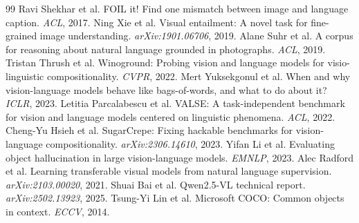\documentclass[10pt,twocolumn,letterpaper]{article}
\begin{document}
\vfill\break
\scriptsize
\begin{thebibliography}{99}
\setlength{\itemsep}{-1pt}
\setlength{\parskip}{0pt}
\setlength{\parsep}{0pt}
 Ravi Shekhar et al. FOIL it! Find one mismatch between image and language caption. {\em ACL}, 2017.
 Ning Xie et al. Visual entailment: A novel task for fine-grained image understanding. {\em arXiv:1901.06706}, 2019.
 Alane Suhr et al. A corpus for reasoning about natural language grounded in photographs. {\em ACL}, 2019.
 Tristan Thrush et al. Winoground: Probing vision and language models for visio-linguistic compositionality. {\em CVPR}, 2022.
 Mert Yuksekgonul et al. When and why vision-language models behave like bags-of-words, and what to do about it? {\em ICLR}, 2023.
 Letitia Parcalabescu et al. VALSE: A task-independent benchmark for vision and language models centered on linguistic phenomena. {\em ACL}, 2022.
 Cheng-Yu Hsieh et al. SugarCrepe: Fixing hackable benchmarks for vision-language compositionality. {\em arXiv:2306.14610}, 2023.
 Yifan Li et al. Evaluating object hallucination in large vision-language models. {\em EMNLP}, 2023.
 Alec Radford et al. Learning transferable visual models from natural language supervision. {\em arXiv:2103.00020}, 2021.
 Shuai Bai et al. Qwen2.5-{VL} technical report. {\em arXiv:2502.13923}, 2025.
 Tsung-Yi Lin et al. Microsoft {COCO}: Common objects in context. {\em ECCV}, 2014.
\end{thebibliography}
\end{document}
